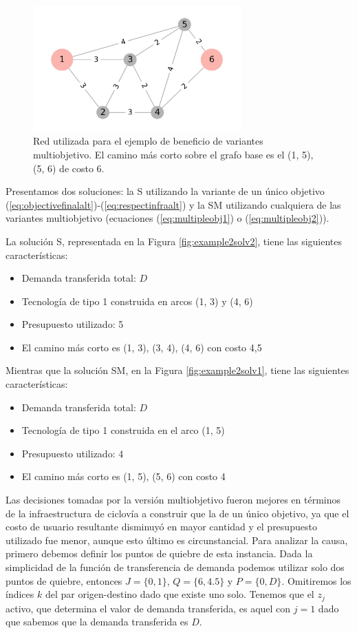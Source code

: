 \begin{figure}[h!]
  \centering
  \includegraphics[width=8cm]{../resources/example_2_base.png}
  \caption{Red utilizada para el ejemplo de beneficio de variantes multiobjetivo. El camino más corto sobre el grafo base es el (1, 5), (5, 6) de costo 6.}
  \label{fig:example2base}
\end{figure}

\FloatBarrier

Presentamos dos soluciones: la S utilizando la variante de un único objetivo (\ref{eq:objectivefinalalt})-(\ref{eq:respectinfraalt}) y la SM utilizando cualquiera de las variantes multiobjetivo (ecuaciones (\ref{eq:multipleobj1}) o (\ref{eq:multipleobj2})).

La solución S, representada en la Figura \ref{fig:example2solv2}, tiene las siguientes características:

\begin{itemize}
  \item{Demanda transferida total: $D$}
  \item{Tecnología de tipo 1 construida en arcos (1, 3) y (4, 6)}
  \item{Presupuesto utilizado: 5}
  \item{El camino más corto es (1, 3), (3, 4), (4, 6) con costo 4,5}
\end{itemize}

Mientras que la solución SM, en la Figura \ref{fig:example2solv1}, tiene las siguientes características:

\begin{itemize}
  \item{Demanda transferida total: $D$}
  \item{Tecnología de tipo 1 construida en el arco (1, 5)}
  \item{Presupuesto utilizado: 4}
  \item{El camino más corto es (1, 5), (5, 6) con costo 4}
\end{itemize}

Las decisiones tomadas por la versión multiobjetivo fueron mejores en términos de la infraestructura de ciclovía a construir que la de un único objetivo, ya que el costo de usuario resultante disminuyó en mayor cantidad y el presupuesto utilizado fue menor, aunque esto último es circunstancial. Para analizar la causa, primero debemos definir los puntos de quiebre de esta instancia. Dada la simplicidad de la función de transferencia de demanda podemos utilizar solo dos puntos de quiebre, entonces $J = \{0, 1\}$, $Q = \{6, 4.5\}$ y $P = \{0, D\}$. Omitiremos los índices $k$ del par origen-destino dado que existe uno solo. Tenemos que el $z_j$ activo, que determina el valor de demanda transferida, es aquel con $j = 1$ dado que sabemos que la demanda transferida es $D$.

